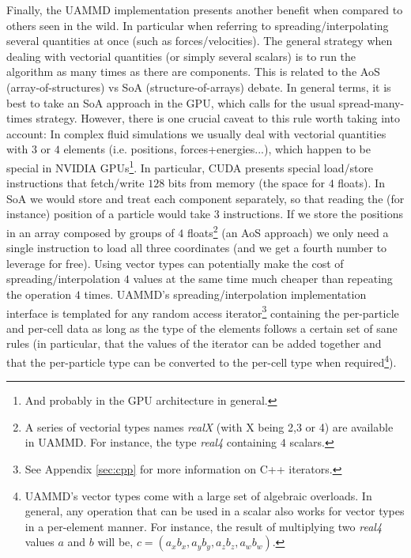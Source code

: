 \documentclass[ twoside,openright,titlepage,numbers=noenddot,%
headinclude,footinclude,cleardoublepage=empty,abstract=on,
BCOR=5mm,paper=b5,fontsize=11pt, dvipsnames
]{scrreprt}
\newcommand{\uammd}{\gls{UAMMD}\xspace}
\begin{document}
Finally, the \uammd implementation presents another benefit when compared to others seen in the wild. In particular when referring to spreading/interpolating several quantities at once (such as forces/velocities). The general strategy when dealing with vectorial quantities (or simply several scalars) is to run the algorithm as many times as there are components. This is related to the AoS (array-of-structures) vs SoA (structure-of-arrays) debate. In general terms, it is best to take an SoA approach in the GPU, which calls for the usual spread-many-times strategy. However, there is one crucial caveat to this rule worth taking into account: In complex fluid simulations we usually deal with vectorial quantities with $3$ or $4$ elements (i.e. positions, forces+energies...), which happen to be special in NVIDIA GPUs\footnote{And probably in the GPU architecture in general.}. In particular, CUDA presents special load/store instructions that fetch/write $128$ bits from memory (the space for $4$ floats). In SoA we would store and treat each component separately, so that reading the (for instance) position of a particle would take $3$ instructions. If we store the positions in an array composed by groups of $4$ floats\footnote{A series of vectorial types names \emph{realX} (with X being 2,3 or 4) are available in \uammd. For instance, the type \emph{real4} containing $4$ scalars.} (an AoS approach) we only need a single instruction to load all three coordinates (and we get a fourth number to leverage for free). Using vector types can potentially make the cost of spreading/interpolation $4$ values at the same time much cheaper than repeating the operation $4$ times. \uammd's spreading/interpolation implementation interface is templated for any random access iterator\footnote{See Appendix \ref{sec:cpp} for more information on C++ iterators.} containing the per-particle and per-cell data as long as the type of the elements follows a certain set of sane rules (in particular, that the values of the iterator can be added together and that the per-particle type can be converted to the per-cell type when required\footnote{\uammd's vector types come with a large set of algebraic overloads. In general, any operation that can be used in a scalar also works for vector types in a per-element manner. For instance, the result of multiplying two \emph{real4} values $a$ and $b$ will be, $c = (a_xb_x, a_yb_y, a_zb_z, a_wb_w)$.}).
\end{document}
